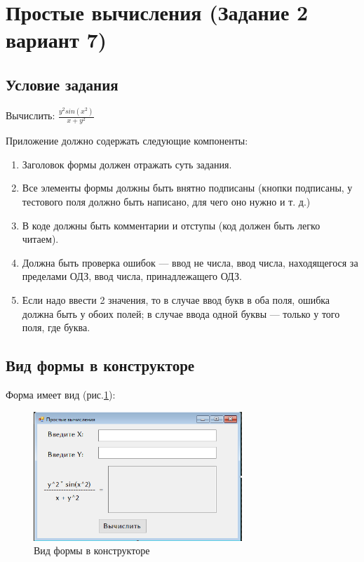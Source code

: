 \section{Простые вычисления (Задание 2 вариант 7)}

\subsection{Условие задания}

Вычислить: $\frac{y^2 sin (x^2)}{x + y^2}$

Приложение должно содержать следующие компоненты:

\begin{enumerate}
    \item{Заголовок формы должен отражать суть задания.}
    \item{Все элементы формы должны быть внятно подписаны (кнопки подписаны, у тестового поля должно быть написано, для чего оно нужно и т. д.)}
    \item{В коде должны быть комментарии и отступы (код должен быть легко читаем).}
    \item{Должна быть проверка ошибок --- ввод не числа, ввод числа, находящегося за пределами ОДЗ, ввод числа, принадлежащего ОДЗ.}
    \item{Если надо ввести 2 значения, то в случае ввод букв в оба поля, ошибка должна быть у обоих полей; в случае ввода одной буквы --- только у того поля, где буква.}
\end{enumerate}

\subsection{Вид формы в конструкторе}

Форма имеет вид (рис.\ref{fig:FormInConstruct2}):

\begin{figure}[!h]
    \centering
    \includegraphics[width = 0.7\textwidth]{images/Task2/FormInConstructor.png}
    \caption{Вид формы в конструкторе}
    \label{fig:FormInConstruct2}
\end{figure}

